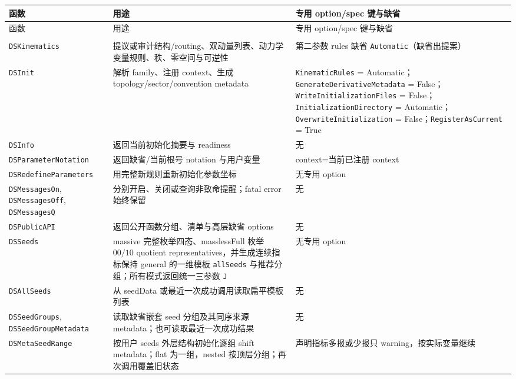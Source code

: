 ﻿\documentclass[a4paper,11pt]{article}
\begin{document}
\begingroup
\scriptsize
\renewcommand{\arraystretch}{0.98}
\begin{longtable}{@{}>{\raggedright\arraybackslash}p{}>{\raggedright\arraybackslash}p{}>{\raggedright\arraybackslash}p{}@{}}
\toprule
函数 & 用途 & 专用 option/spec 键与缺省 \\
\midrule
\endfirsthead
\toprule
函数 & 用途 & 专用 option/spec 键与缺省 \\
\midrule
\endhead
\midrule
\multicolumn{3}{r}{续下页} \\
\endfoot
\bottomrule
\endlastfoot
\texttt{DSKinematics} & 提议或审计结构/routing、双动量列表、动力学变量规则、秩、零空间与可逆性 & 第二参数 rules 缺省 \texttt{Automatic}（缺省出提案） \\
\texttt{DSInit} & 解析 family、注册 context、生成 topology/sector/convention metadata & \texttt{KinematicRules} = Automatic；\allowbreak\texttt{GenerateDerivativeMetadata} = False；\allowbreak\texttt{WriteInitializationFiles} = False；\allowbreak\texttt{InitializationDirectory} = Automatic；\allowbreak\texttt{OverwriteInitialization} = False；\allowbreak\texttt{RegisterAsCurrent} = True \\
\texttt{DSInfo} & 返回当前初始化摘要与 readiness & 无 \\
\texttt{DSParameterNotation} & 返回缺省/当前根号 notation 与用户变量 & context=当前已注册 context \\
\texttt{DSRedefineParameters} & 用完整新规则重新初始化参数坐标 & 无专用 option \\
\texttt{DSMessagesOn}, \texttt{DSMessagesOff}, \texttt{DSMessagesQ} & 分别开启、关闭或查询非致命提醒；fatal error 始终保留 & 无 \\
\texttt{DSPublicAPI} & 返回公开函数分组、清单与高层缺省 options & 无 \\
\texttt{DSSeeds} & massive 完整枚举四态、masslessFull 枚举 $00/10$ quotient representatives，并生成连续指标保持 general 的一维模板 \texttt{allSeeds} 与推荐分组；所有模式返回统一三参数 \texttt{J} & 无专用 option \\
\texttt{DSAllSeeds} & 从 seedData 或最近一次成功调用读取扁平模板列表 & 无 \\
\texttt{DSSeedGroups}, \texttt{DSSeedGroupMetadata} & 读取缺省嵌套 seed 分组及其同序来源 metadata；也可读取最近一次成功结果 & 无 \\
\texttt{DSMetaSeedRange} & 按用户 seeds 外层结构初始化逐组 shift metadata；flat 为一组，nested 按顶层分组；再次调用覆盖旧状态 & 声明指标多报或少报只 warning，按实际变量继续 \\

\end{longtable}
\end{document}
